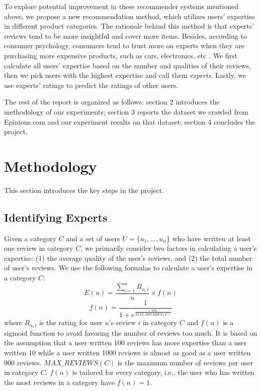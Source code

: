 \documentclass[12pt]{article}
\begin{document}
To explore potential improvement in these recommender systems mentioned above, we propose a new recommendation method, which utilizes users' expertise in different product categories. The rationale behind this method is that experts' reviews tend to be more insightful and cover more items. Besides, according to consumer psychology, consumers tend to trust more on experts when they are purchasing more expensive products, such as cars, electronics, etc \cite{consumer}. We first calculate all users' expertise based on the number and qualities of their reviews, then we pick users with the highest expertise and call them \emph{experts}. Lastly, we use experts' ratings to predict the ratings of other users. 

The rest of the report is organized as follows: section 2 introduces the methodology of our experiments; section 3 reports the dataset we crawled from Epinions.com and our experiment results on that dataset; section 4 concludes the project. 

\section{Methodology}
This section introduces the key steps in the project. 

\subsection{Identifying Experts} %
\label{sub:identifying_experts}

Given a category $C$ and a set of users $U = \{{u_{1}, ..., u_{n}}\}$ who have written at least one review in category $C$, we primarily consider two factors in calculating a user's expertise: (1) the average quality of the user's reviews, and (2) the total number of user's reviews. We use the following formulas to calculate a user's expertise in a category $C$:
\begin{equation}
E(u) = \frac{\sum_{i=1}^n R_{u, i}} {n} \times f(n)
\end{equation}
\begin{equation}
f(n) = \frac{1}{1 + e^{\frac{-10n} {MAX\_REVIEWS(C)}}}
\end{equation}
where $R_{u, i}$ is the rating for user $u$'s review $i$ in category $C$ and $f(n)$ is a sigmoid function to avoid favoring the number of reviews too much. It is based on the assumption that a user written 100 reviews has more expertise than a user written 10 while a user written 1000 reviews is almost as good as a user written 900 reviews. $MAX\_REVIEWS(C)$ is the maximum number of reviews per user in category $C$. $f(n)$ is tailored for every category, i.e., the user who has written the most reviews in a category have $f(n)=1$.
\end{document}
